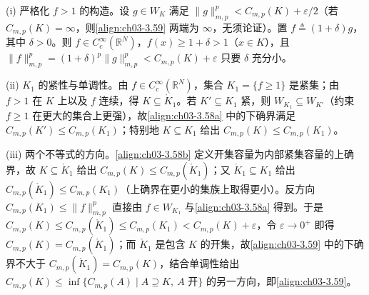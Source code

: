 \documentclass[../../main.tex]{subfiles}%
\begin{document}
\begin{remark}\label{remark:ch03-容量定义适定补充}
(i) 严格化 $f>1$ 的构造。设 $g\in W_K$ 满足 $\|g\|_{m,p}^p<C_{m,p}(K)+\varepsilon/2$（若 $C_{m,p}(K)=\infty$，则\eqref{align:ch03-3.59} 两端为 $\infty$，无须论证）。置 $f\triangleq(1+\delta)g$，其中 $\delta>0$。则 $f\in C^\infty_c(\mathbb{R}^N)$，$f(x)\geqslant1+\delta>1$（$x\in K$），且 $\|f\|_{m,p}^p=(1+\delta)^p\|g\|_{m,p}^p<C_{m,p}(K)+\varepsilon$ 只要 $\delta$ 充分小。

(ii) $K_1$ 的紧性与单调性。由 $f\in C^\infty_c(\mathbb{R}^N)$，集合 $K_1=\{f\geqslant1\}$ 是紧集；由 $f>1$ 在 $K$ 上以及 $f$ 连续，得 $K\subseteq\mathring K_1$。若 $K'\subseteq K_1$ 紧，则 $W_{K_1}\subseteq W_{K'}$（约束 $f\geqslant1$ 在更大的集合上更强），故\eqref{align:ch03-3.58a} 中的下确界满足 $C_{m,p}(K')\leqslant C_{m,p}(K_1)$；特别地 $K\subseteq K_1$ 给出 $C_{m,p}(K)\leqslant C_{m,p}(K_1)$。

(iii) 两个不等式的方向。\eqref{align:ch03-3.58b} 定义开集容量为内部紧集容量的上确界，故 $K\subseteq\mathring K_1$ 给出 $C_{m,p}(K)\leqslant C_{m,p}(\mathring K_1)$；又 $\mathring K_1\subseteq K_1$ 给出 $C_{m,p}(\mathring K_1)\leqslant C_{m,p}(K_1)$（上确界在更小的集族上取得更小）。反方向 $C_{m,p}(K_1)\leqslant\|f\|_{m,p}^p$ 直接由 $f\in W_{K_1}$ 与\eqref{align:ch03-3.58a} 得到。于是 $C_{m,p}(K)\leqslant C_{m,p}(\mathring K_1)\leqslant C_{m,p}(K_1)<C_{m,p}(K)+\varepsilon$，令 $\varepsilon\to0^+$ 即得 $C_{m,p}(K)=C_{m,p}(\mathring K_1)$；而 $\mathring K_1$ 是包含 $K$ 的开集，故\eqref{align:ch03-3.59} 中的下确界不大于 $C_{m,p}(\mathring K_1)=C_{m,p}(K)$，结合单调性给出 $C_{m,p}(K)\leqslant\inf\{C_{m,p}(A)\mid A\supseteq K,\ A\text{ 开}\}$ 的另一方向，即\eqref{align:ch03-3.59}。
\end{remark}
\end{document}
